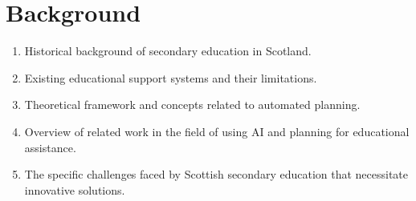 \section{Background}
\begin{enumerate}
    \item Historical background of secondary education in Scotland.
    \item Existing educational support systems and their limitations.
    \item Theoretical framework and concepts related to automated planning.
    \item Overview of related work in the field of using AI and planning for educational assistance.
    \item The specific challenges faced by Scottish secondary education that necessitate innovative solutions.
\end{enumerate}
